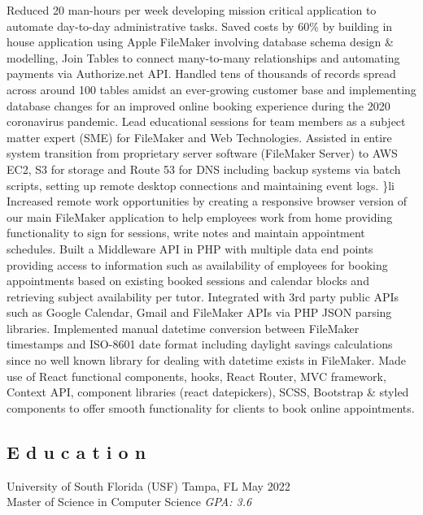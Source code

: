 \documentclass{resume}
\begin{document}
\begin{itemize}
\li Reduced 20 man-hours per week developing mission critical application to automate day-to-day administrative tasks.
\li Saved costs by 60\% by building in house application using Apple FileMaker involving database schema design \& modelling, Join Tables to connect many-to-many relationships and automating payments via Authorize.net API.
\li Handled tens of thousands of records spread across around 100 tables amidst an ever-growing customer base and implementing database changes for an improved online booking experience during the 2020 coronavirus pandemic.
\li Lead educational sessions for team members as a subject matter expert (SME) for FileMaker and Web Technologies.
\li Assisted in entire system transition from proprietary server software (FileMaker Server) to AWS EC2, S3 for storage and Route 53 for DNS including backup systems via batch scripts, setting up remote desktop connections and maintaining event logs.
    \}li Increased remote work opportunities by creating a responsive browser version of our main FileMaker application to help employees work from home providing functionality to sign for sessions, write notes and maintain appointment schedules.
\li Built a Middleware API in PHP with multiple data end points providing access to information such as availability of employees for booking appointments based on existing booked sessions and calendar blocks and retrieving subject availability per tutor.
\li Integrated with 3rd party public APIs such as Google Calendar, Gmail and FileMaker APIs via PHP JSON parsing libraries.
\li Implemented manual datetime conversion between FileMaker timestamps and ISO-8601 date format including daylight savings calculations since no well known library for dealing with datetime exists in FileMaker.
\li Made use of React functional components, hooks, React Router, MVC framework, Context API, component libraries (react datepickers), SCSS, Bootstrap \& styled components to offer smooth functionality for clients to book online appointments.
\end{itemize}


\subsection{E d u c a t i o n}
\schoolInfoLocationDate
  {University of South Florida (USF)}
  {Tampa, FL}
  {May 2022} \\
Master of Science in Computer Science \hfill \emph{GPA: 3.6}
\end{document}
